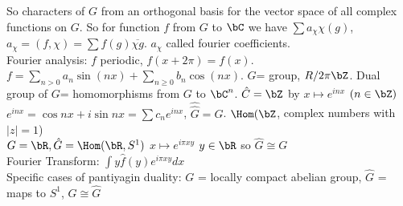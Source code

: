 \noindent
So characters of $G$ from an orthogonal basis for the vector space of all complex functions on $G$. So for function $f$ from $G$ to $\bC$ we have $\sum a_{\chi} \chi(g)$, $a_{\chi} = (f, \chi) = \sum f(g) \overline{\chi{g}}$. $a_{\chi}$ called fourier coefficients. \\

\noindent
Fourier analysis: $f$ periodic, $f(x + 2 \pi) = f(x)$. $f = \sum_{n >0}a_n \sin (nx) + \sum_{n \ge 0 }b_n \cos (nx)$. $G$= group, $R/2\pi \bZ$. Dual group of $G$= homomorphisms from $G$ to $\bC^n$. $\hat{C} = \bZ$ by $x \mapsto e^{inx}$ $(n \in \bZ)$ \\
$e^{i n x} = \cos n x + i \sin n x = \sum c_n e^{inx}$, $\hat{\hat{G}} = G$. $\Hom(\bZ$, complex numbers with $|z|=1$) \\
$G = \bR, \hat{G} = \Hom(\bR, S^1)$ $x \mapsto e^{i \pi x y}$ $y \in \bR$ so $\hat{G} \cong G$ \\
Fourier Transform: $\int y \hat{f}(y)e^{i \pi xy}dx$  \\
Specific cases of pantiyagin duality: $G$ = locally compact abelian group, $\hat{G}$ = maps to $S^1$, $G \cong \hat{G}$ 

